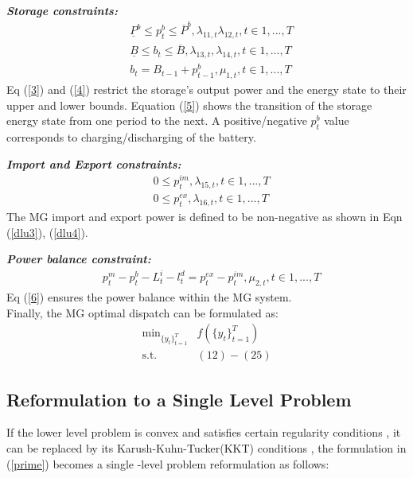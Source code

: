 \textbf{\emph{Storage constraints:} }
\begin{align}
&\underline P^b\leq  p^b_{t}\leq  \overline P^b \label{3},  \lambda_{11,t}\lambda_{12,t}, t\in{1,...,T}  \\
&\underline B\leq  b_{t}\leq  \overline B\label{4}, \lambda_{13,t},\lambda_{14,t}, t\in{1,...,T} \\
&b_{t}=B_{t-1}+p^b_{t-1}, \mu_{1,t}, t\in{1,...,T}  \label{5}
\end{align}
Eq (\ref{3}) and (\ref{4}) restrict the storage's output power and the energy state to their upper and lower bounds. Equation (\ref{5}) shows the transition of the storage energy state from one period to the next. A positive/negative $p^b_{t}$ value corresponds to charging/discharging of the battery.

\textbf{\emph{Import and Export constraints:} }
\begin{align}
& 0 \leq  p^{im}_t, \lambda_{15,t}, t\in{1,...,T} \label{dlu3}\\
& 0 \leq p^{ex}_t, \lambda_{16,t},  t\in{1,...,T} \label{dlu4}
\end{align}
The MG import and export power is defined to be non-negative as shown in Eqn (\ref{dlu3}), (\ref{dlu4}).

\textbf{\emph{Power balance constraint:} }
\begin{align}
&p^m_{t}-p^b_{t} -L^i_{t}-l^d_{t}=p^{ex}_{t}-p^{im}_{t}, \mu_{2,t}, t\in{1,...,T}\label{6}
\end{align}
Eq (\ref{6}) ensures the power balance within the MG system.\\

Finally, the MG optimal dispatch can be formulated as: 
\begin{subequations}
\begin{align}
\text{min}_{\{y_t\}^{T}_{t=1}} & f\left(\{y_t\}^{T}_{t=1}\right)\nonumber\\
\text{s.t.  }  & (12) - (25)\nonumber
\end{align}
\end{subequations}

\subsection{Reformulation to a Single Level Problem}
If the lower level problem is convex and satisfies certain regularity conditions \cite{convex}, it can be replaced by its Karush-Kuhn-Tucker(KKT) conditions \cite{bilevel1}, the formulation in (\ref{prime}) becomes a single -level problem reformulation as follows:

